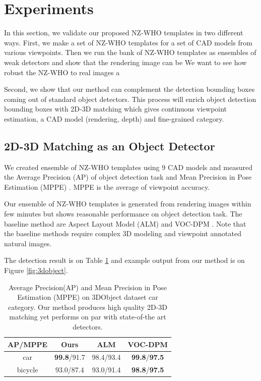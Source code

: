 \documentclass[10pt,twocolumn,letterpaper]{article}
\begin{document}
\section{Experiments}

In this section, we validate our proposed NZ-WHO templates in two different ways. First, we make a set of NZ-WHO templates for a set of CAD models from various viewpoints. Then we run the bank of NZ-WHO templates as ensembles of weak detectors and show that the rendering image can be We want to see how robust the NZ-WHO to real images a

Second, we show that our method can complement the detection bounding boxes coming out of standard object detectors. This process will enrich object detection bounding boxes with 2D-3D matching which gives continuous viewpoint estimation, a CAD model (rendering, depth) and fine-grained category.  

\subsection{2D-3D Matching as an Object Detector} 

We created ensemble of NZ-WHO templates using 9 CAD models and measured the Average Precision (AP) of object detection task and Mean Precision in Pose Estimation (MPPE) \cite{Lopez-Sastre11}. MPPE is the average of viewpoint accuracy.  


Our ensemble of NZ-WHO templates is generated from rendering images within few minutes but shows reasonable performance on object detection task. The baseline method are Aspect Layout Model (ALM) \cite{Xiang12} and VOC-DPM \cite{Pepik12}. Note that the baseline methods require complex 3D modeling and viewpoint annotated natural images.

The detection result is on Table \ref{tab:3dobject} and example output from our method is on Figure \ref{fig:3dobject}. 

\begin{table}[!htbp]
    \footnotesize
  \begin{center}
    \begin{tabular}{|c|c|c|c|}
    \hline
     AP/MPPE& Ours & ALM\cite{Xiang12} & VOC-DPM\cite{Pepik12} \\
    \hline\hline
    car & \textbf{99.8}/91.7 &  98.4/93.4 & \textbf{99.8}/\textbf{97.5} \\ 
    bicycle & 93.0/87.4 & 93.0/91.4 & \textbf{98.8}/\textbf{97.5} \\
    \hline
    \end{tabular}
  \end{center}
  \caption{Average Precision(AP) and Mean Precision in Pose Estimation (MPPE) on 3DObject dataset car category. Our method produces high quality 2D-3D matching yet performs on par with state-of-the art detectors.}
  \label{tab:3dobject}
\end{table}
\end{document}
